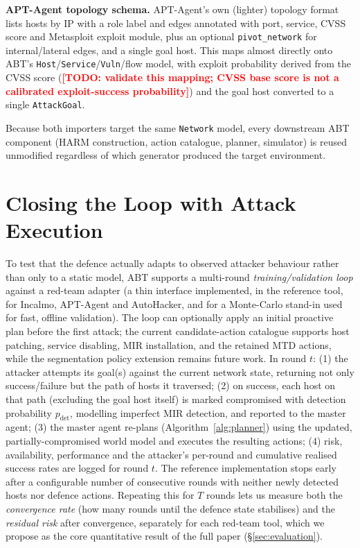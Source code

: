 \documentclass[conference]{IEEEtran}
\newcommand{\todo}[1]{\textcolor{red}{\textbf{[TODO: #1]}}}
\begin{document}
\textbf{APT-Agent topology schema.} APT-Agent's own (lighter) topology format lists
hosts by IP with a role label and edges annotated with port, service, CVSS score and
Metasploit exploit module, plus an optional \texttt{pivot\_network} for
internal/lateral edges, and a single goal host. This maps almost directly onto ABT's
\texttt{Host}/\texttt{Service}/\texttt{Vuln}/flow model, with exploit probability
derived from the CVSS score (\todo{validate this mapping; CVSS base score is not a
calibrated exploit-success probability}) and the goal host converted to a single
\texttt{AttackGoal}.

Because both importers target the same \texttt{Network} model, every downstream ABT
component (HARM construction, action catalogue, planner, simulator) is reused
unmodified regardless of which generator produced the target environment.

\section{Closing the Loop with Attack Execution}
\label{sec:loop}

To test that the defence actually adapts to observed attacker behaviour rather than
only to a static model, ABT supports a multi-round \emph{training/validation loop}
against a red-team adapter (a thin interface implemented, in the reference tool, for
Incalmo, APT-Agent and AutoHacker, and for a Monte-Carlo stand-in used for fast,
offline validation). The loop can optionally apply an initial proactive plan before
the first attack; the current candidate-action catalogue supports host patching,
service disabling, MIR installation, and the retained MTD actions, while the
segmentation policy extension remains future work. In round $t$: (1) the attacker
attempts its goal(s) against the current network state, returning not only
success/failure but the path of hosts it
traversed; (2) on success, each host on that path (excluding the goal host itself) is
marked compromised with detection probability $p_{\mathrm{det}}$, modelling imperfect
MIR detection, and reported to the master agent; (3) the master agent re-plans
(Algorithm~\ref{alg:planner}) using the updated, partially-compromised world model and
executes the resulting actions; (4) risk, availability, performance and the
attacker's per-round and cumulative realised success rates are logged for round $t$.
The reference implementation stops early after a configurable number of consecutive
rounds with neither newly detected hosts nor defence actions. Repeating this for $T$
rounds lets us measure both the \emph{convergence rate} (how many rounds until the
defence state stabilises) and the \emph{residual risk} after convergence, separately
for each red-team tool, which we propose as the core quantitative result of the full
paper (\S\ref{sec:evaluation}).
\end{document}
